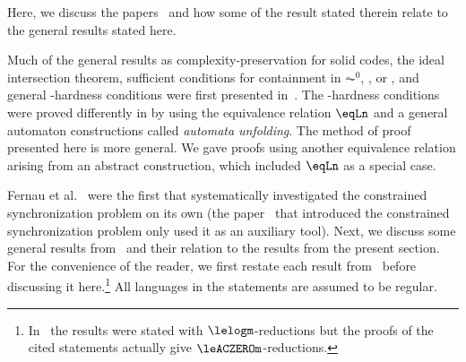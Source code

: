 
Here, we discuss the papers~\cite{FernauGHHVW19,DBLP:conf/fct/Hoffmann21,DBLP:conf/cocoon/Hoffmann21,HoffmannCocoonExtended} 
and how some of the result stated therein relate to the general results stated here.

Much of the general results as complexity-preservation for solid codes, the ideal intersection theorem,
sufficient conditions for containment in $\AC^0$, \LOGSPACE, or \NL,
and general \PSPACE-hardness conditions were first presented in~\cite{HoffmannCocoonExtended}. The 
\PSPACE-hardness conditions were proved differently in \cite{HoffmannCocoonExtended}
by using the equivalence relation $\eqLn$ and a general automaton constructions called \emph{automata unfolding}.
The method of proof presented here is more general. We gave proofs using another
equivalence relation arising from an abstract construction, which included $\eqLn$ as a special case.

Fernau et al.~\cite{FernauGHHVW19} were the first that
 systematically investigated the constrained synchronization problem on its own (the paper~\cite{Gusev2012} that introduced the constrained synchronization problem only used it as an auxiliary tool).
Next, we discuss some general results from~\cite{FernauGHHVW19} and their relation to the results from the present section.
For the convenience of the reader, we first restate each result from~\cite{FernauGHHVW19} before discussing it here.\footnote{In~\cite{FernauGHHVW19} the results were stated with $\lelogm$-reductions but the proofs of the cited statements actually give $\leACZEROm$-reductions.}
All languages in the statements are assumed to be regular.

